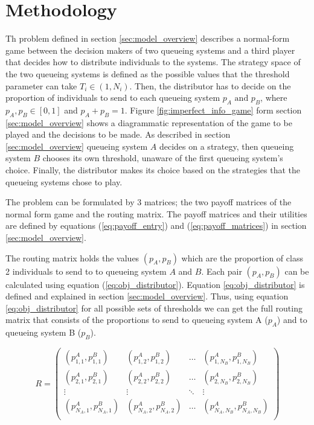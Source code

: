 \section{Methodology}\label{sec:methodology}

Th problem defined in section \ref{sec:model_overview} describes a normal-form
game between the decision makers of two queueing systems and a third player that 
decides how to distribute individuals to the systems.
The strategy space of the two queueing systems is defined as the possible values
that the threshold parameter can take \(T_i \in (1, N_i)\).
Then, the distributor has to decide on the proportion of individuals to send to 
each queueing system \(p_A \text{ and } p_B\), where \(p_A, p_B \in [0, 1] \)
and \(p_A + p_B = 1\).
Figure \ref{fig:imperfect_info_game} form section \ref{sec:model_overview} 
shows a diagrammatic representation of the game to be played and the decisions 
to be made.
As described in section \ref{sec:model_overview} queueing system \(A\) decides
on a strategy, then queueing system \(B\) chooses its own threshold, unaware 
of the first queueing system's choice.
Finally, the distributor makes its choice based on the strategies that the 
queueing systems chose to play. 

The problem can be formulated by 3 matrices; the two payoff matrices of the 
normal form game and the routing matrix.
The payoff matrices and their utilities are defined by equations 
(\ref{eq:payoff_entry}) and (\ref{eq:payoff_matrices}) in section 
\ref{sec:model_overview}.

The routing matrix holds the values \((p_A, p_B)\) which are the proportion 
of class 2 individuals to send to to queueing system \(A\) and \(B\).
Each pair \((p_A, p_B)\) can be calculated using equation 
(\ref{eq:obj_distributor}).
Equation \ref{eq:obj_distributor} is defined and explained in section 
\ref{sec:model_overview}.
Thus, using equation \ref{eq:obj_distributor} for all possible sets of 
thresholds we can get the full routing matrix that consists of the proportions
to send to queueing system A (\(p_A\)) and to queueing system B (\(p_B\)).

\begin{equation}\label{eq:routing_matrix}
    R = 
    \begin{pmatrix}
        (p_{1,1}^A, p_{1,1}^B) & (p_{1,2}^A, p_{1,2}^B) & \dots & 
        (p_{1,N_B}^A, p_{1,N_B}^B) \\
        (p_{2,1}^A, p_{2,1}^B) & (p_{2,2}^A, p_{2,2}^B) & \dots & 
        (p_{2,N_B}^A, p_{2,N_B}^B) \\
        \vdots & \vdots & \ddots & \vdots \\
        (p_{N_A,1}^A, p_{N_A,1}^B) & (p_{N_A,2}^A, p_{N_A,2}^B) & \dots & 
        (p_{N_A,N_B}^A, p_{N_A,N_B}^B) \\
    \end{pmatrix}
\end{equation}


